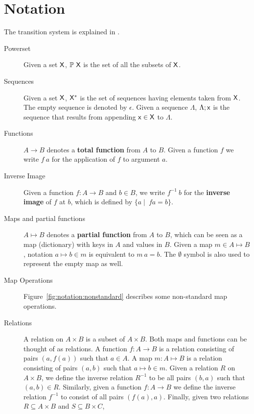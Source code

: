 \section{Notation}
\label{sec:notation-shelley}

The transition system is explained in \cite{small_step_semantics}.

\begin{description}
  \item[Powerset] Given a set $\mathsf{X}$, $\mathbb{P}~\mathsf{X}$ is the set of all
    the subsets of $\mathsf{X}$.
  \item[Sequences] Given a set $\mathsf{X}$, $\mathsf{X}^{*}$ is the set of
    sequences having elements taken from $\mathsf{X}$. The empty sequence is
    denoted by $\epsilon$. Given a sequence $\Lambda$, $\Lambda; \mathsf{x}$ is
    the sequence that results from appending $\mathsf{x} \in \mathsf{X}$ to
    $\Lambda$.
  \item[Functions] $A \to B$ denotes a \textbf{total function} from $A$ to $B$.
    Given a function $f$ we write $f~a$ for the application of $f$ to argument
    $a$.
  \item[Inverse Image] Given a function $f: A \to B$ and $b\in B$, we write
    $f^{-1}~b$ for the \textbf{inverse image} of $f$ at $b$, which is defined by
    $\{a \mid\ f a =  b\}$.
  \item[Maps and partial functions] $A \mapsto B$ denotes a \textbf{partial
    function} from $A$ to $B$, which can be seen as a map (dictionary) with
    keys in $A$ and values in $B$. Given a map $m \in A \mapsto B$, notation
    $a \mapsto b \in m$ is equivalent to $m~ a = b$. 
    The $\emptyset$ symbol is also used to
    represent the empty map as well.
  \item[Map Operations] Figure~\ref{fig:notation:nonstandard}
    describes some non-standard map operations.
  \item[Relations] A relation on $A\times B$ is a subset of $A\times B$.
    Both maps and functions can be thought of as relations.
    A function $f:A\to B$ is a relation consisting of pairs $(a, f(a))$ such that $a\in A$.
    A map $m: A\mapsto B$ is a relation consisting of pairs $(a, b)$ such that
    $a\mapsto b \in m$.
    Given a relation $R$ on $A\times B$, we define the inverse relation $R^{-1}$ to be
    all pairs $(b, a)$ such that $(a, b)\in R$. Similarly, given a function $f:A\to B$ we
    define the inverse relation $f^{-1}$ to consist of all pairs $(f(a), a)$.
    Finally, given two relations $R\subseteq A\times B$ and $S\subseteq B\times C$,

\end{description}
